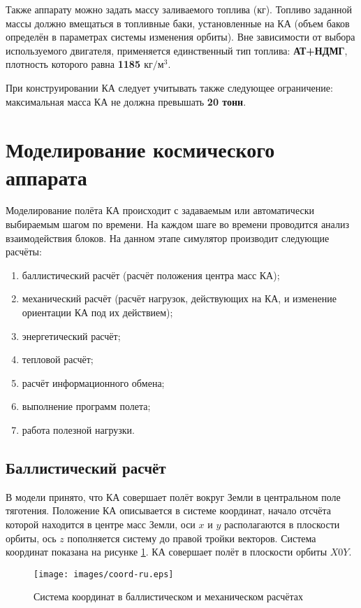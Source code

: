 \documentclass[12pt,a4paper]{article}
\begin{document}
Также аппарату можно задать массу заливаемого топлива (кг). Топливо заданной массы должно
вмещаться в топливные баки, установленные на КА (объем баков определён в параметрах
системы изменения орбиты). Вне зависимости от выбора используемого двигателя, применяется
единственный тип топлива: \textbf{АТ+НДМГ}, плотность которого равна \textbf{1185
  $\text{кг}/\text{м}^3$}.

При конструировании КА следует учитывать также следующее ограничение: максимальная масса
КА не должна превышать \textbf{20 тонн}.

\section{Моделирование космического аппарата}

Моделирование полёта КА происходит с задаваемым или автоматически выбираемым шагом по
времени. На каждом шаге во времени проводится анализ взаимодействия блоков. На данном
этапе симулятор производит следующие расчёты:

\begin{enumerate}
  \item баллистический расчёт (расчёт положения центра масс КА);
  \item механический расчёт (расчёт нагрузок, действующих на КА, и изменение ориентации КА под их действием);
  \item энергетический расчёт;
  \item тепловой расчёт;
  \item расчёт информационного обмена;
  \item выполнение программ полета;
  \item работа полезной нагрузки.
\end{enumerate}

\subsection{Баллистический расчёт}
\label{Sec:Ballistics}

В модели принято, что КА совершает полёт вокруг Земли в центральном поле
тяготения. Положение КА описывается в системе координат, начало отсчёта которой находится
в центре масс Земли, оси $x$ и $y$ располагаются в плоскости орбиты, ось $z$ пополняется систему
до правой тройки векторов. Система координат показана на рисунке \ref{Pic:Coord}. КА
совершает полёт в плоскости орбиты $X0Y$.

\begin{figure}[tbh]
  \begin{center}
    \texttt{[image: images/coord-ru.eps]}
    \caption{Система координат в баллистическом и механическом расчётах}
    \label{Pic:Coord}
  \end{center}
\end{figure}
\end{document}

